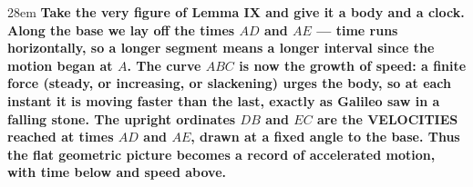 \documentclass[border=4pt]{standalone}
\begin{document}
\begin{varwidth}{28em}
\large\bfseries
Take the very figure of Lemma IX and give it a body and a clock. Along the base we lay off      \textcolor{timeblue}{the times $AD$ and $AE$} — time runs horizontally, so a longer segment means a      longer interval since the motion began at $A$. The curve $ABC$ is now the growth of speed:      a finite force (steady, or increasing, or slackening) urges the body, so at each instant it      is moving faster than the last, exactly as Galileo saw in a falling stone. The upright      \textcolor{velgreen}{ordinates $DB$ and $EC$} are the VELOCITIES reached at times $AD$ and $AE$, drawn      at a fixed angle to the base. Thus the flat geometric picture becomes a record of accelerated      motion, with time below and speed above.
\end{varwidth}
\end{document}
